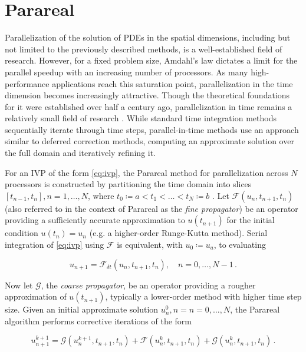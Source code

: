 \section{Parareal}

Parallelization of the solution of PDEs in the spatial dimensions, including but not limited to the previously described methods, is a well-established field of research. However, for a fixed problem size, Amdahl's law dictates a limit for the parallel speedup with an increasing number of processors. As many high-performance applications reach this saturation point, parallelization in the time dimension becomes increasingly attractive. Though the theoretical foundations for it were established over half a century ago, parallelization in time remains a relatively small field of research \cite{dongarra2014applied}. While standard time integration methods sequentially iterate through time steps, parallel-in-time methods use an approach similar to deferred correction methods, computing an approximate solution over the full domain and iteratively refining it.

For an IVP of the form \ref{eq:ivp}, the Parareal method for parallelization across \(N\) processors is constructed \cite{ruprecht2014convergence}\cite{gander2007analysis} by partitioning the time domain into slices \([t_{n-1}, t_n], n = 1,\dots,N\), where \(t_0 \coloneqq a < t_1 < \dots < t_N \coloneqq b\) . Let \(\mathcal{F}(u_n, t_{n+1}, t_n)\) (also referred to in the context of Parareal as the \textit{fine propagator}) be an operator providing a sufficiently accurate approximation to \(u(t_{n+1})\) for the initial condition \(u(t_n)=u_n\) (e.g. a higher-order Runge-Kutta method). Serial integration of \ref{eq:ivp} using \(\mathcal{F}\) is equivalent, with \(u_0 \coloneqq u_a\), to evaluating

\begin{equation}
    u_{n+1} = \mathcal{F}_{\delta t}(u_n, t_{n+1}, t_n), \quad n = 0,\dots,N-1\,.
    \label{eq:parareal_seq}
\end{equation}

Now let \(\mathcal{G}\), the \textit{coarse propagator}, be an operator providing a rougher approximation of \(u(t_{n+1})\), typically a lower-order method with higher time step size. Given an initial approximate solution \(u_n^0, n = n = 0,\dots,N\), the Parareal algorithm performs corrective iterations of the form

\begin{equation}
    u^{k+1}_{n+1} = \mathcal{G}(u^{k+1}_n, t_{n+1}, t_n) + \mathcal{F}(u^k_n, t_{n+1}, t_n) + \mathcal{G}(u^k_n, t_{n+1}, t_n)\,.
    \label{eq:parareal_it}
\end{equation}

